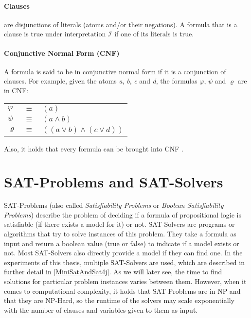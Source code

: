 \paragraph{Clauses}
are disjunctions of literals (atoms and/or their negations). A formula that is a clause is true under interpretation $\mathcal{I}$ if one of its literals is true.

\paragraph{Conjunctive Normal Form (CNF)}
A formula is said to be in conjunctive normal form if it is a conjunction of clauses. 
For example, given the atoms \emph{a}, \emph{b}, \emph{c} and \emph{d}, the formulas $\varphi$, $\psi$ and $\varrho$ are in CNF:
\begin{center}
    \begin{tabular}{ l l l }
    $\varphi$ & $\equiv$ & $(a)$\\
    $\psi$ & $\equiv$ & $(a \land b)$\\
    $\varrho$ & $\equiv$ & $((a \lor b) \land (c \lor d))$\\
\end{tabular}
\end{center}
Also, it holds that every formula can be brought into CNF \cite{LogicForComputerScientists}.


\newpage
\section{SAT-Problems and SAT-Solvers}
SAT-Problems (also called \emph{Satisfiability Problems} or \emph{Boolean Satisfiability Problems}) describe the problem of deciding if a formula of propositional logic is satisfiable (if there exists a model for it) or not. SAT-Solvers are programs or algorithms that try to solve instances of this problem. They take a formula as input and return a boolean value (true or false) to indicate if a model exists or not. Most SAT-Solvers also directly provide a model if they can find one. In the experiments of this thesis, multiple SAT-Solvers are used, which are described in further detail in \ref{MiniSatAndSat4j}. As we will later see, the time to find solutions for particular problem instances varies between them. However, when it comes to computational complexity, it holds that SAT-Problems are in NP and that they are NP-Hard\cite{10.1145/800157.805047}\cite{levin1973universal}, so the runtime of the solvers may scale exponentially with the number of clauses and variables given to them as input.

